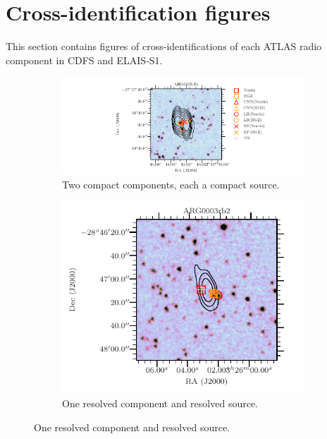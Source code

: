 \section{Cross-identification figures}\label{sec:atlas-xid-examples}

    This section contains figures of cross-identifications of each ATLAS radio component in CDFS and ELAIS-S1.


    \begin{figure}
        \centering
        \begin{subfigure}{0.45\textwidth}
            \includegraphics[width=\textwidth]{atlas-images/examples_all/example_sorted_0_306.pdf}
            \caption{Two compact components, each a compact source.}
        \end{subfigure}
        \begin{subfigure}{0.45\textwidth}
            \includegraphics[width=\textwidth]{atlas-images/examples_all/example_sorted_2_0.pdf}
            \caption{One resolved component and resolved source.}
        \end{subfigure}

\end{figure}

